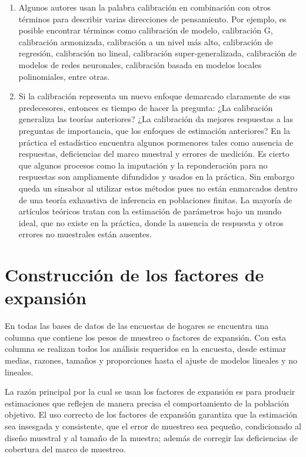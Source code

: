 \documentclass[
  12pt,
  spanish,
]{book}
\begin{document}
\begin{enumerate}
\item
  Algunos autores usan la palabra calibración en combinación con otros términos para describir varias direcciones de pensamiento. Por ejemplo, es posible encontrar términos como calibración de modelo, calibración G, calibración armonizada, calibración a un nivel más alto, calibración de regresión, calibración no lineal, calibración super-generalizada, calibración de modelos de redes neuronales, calibración basada en modelos locales polinomiales, entre otras.
\item
  Si la calibración representa un nuevo enfoque demarcado claramente de sus predecesores, entonces es tiempo de hacer la pregunta: ¿La calibración generaliza las teorías anteriores? ¿La calibración da mejores respuestas a las preguntas de importancia, que los enfoques de estimación anteriores? En la práctica el estadístico encuentra algunos pormenores tales como ausencia de respuestas, deficiencias del marco muestral y errores de medición. Es cierto que algunos procesos como la imputación y la reponderación para no respuestas son ampliamente difundidos y usados en la práctica. Sin embargo queda un sinsabor al utilizar estos métodos pues no están enmarcados dentro de una teoría exhaustiva de inferencia en poblaciones finitas. La mayoría de artículos teóricos tratan con la estimación de parámetros bajo un mundo ideal, que no existe en la práctica, donde la ausencia de respuesta y otros errores no muestrales están ausentes.
\end{enumerate}

\hypertarget{construcciuxf3n-de-los-factores-de-expansiuxf3n}{%
\chapter{Construcción de los factores de expansión}\label{construcciuxf3n-de-los-factores-de-expansiuxf3n}}

En todas las bases de datos de las encuestas de hogares se encuentra una columna que contiene los pesos de muestreo o factores de expansión. Con esta columna se realizan todos los análisis requeridos en la encuesta, desde estimar medias, razones, tamaños y proporciones hasta el ajuste de modelos lineales y no lineales.

La razón principal por la cual se usan los factores de expansión es para producir estimaciones que reflejen de manera precisa el comportamiento de la población objetivo. El uso correcto de los factores de expansión garantiza que la estimación sea insesgada y consistente, que el error de muestreo sea pequeño, condicionado al diseño muestral y al tamaño de la muestra; además de corregir las deficiencias de cobertura del marco de muestreo.
\end{document}
